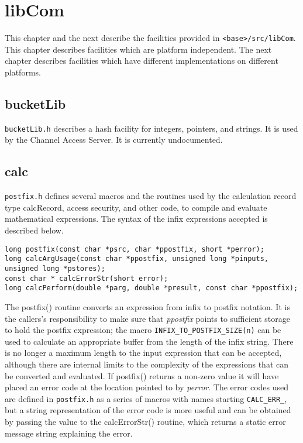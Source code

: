 \chapter{libCom}

This chapter and the next describe the facilities provided in \verb|<base>/src/libCom|.
This chapter describes facilities which are platform independent.
The next chapter describes facilities which have different implementations on different platforms.

\section{bucketLib}

\verb|bucketLib.h| describes a hash facility for integers, pointers, and strings.
It is used by the Channel Access Server.
It is currently undocumented.

\section{calc}

\verb|postfix.h| defines several macros and the routines used by the calculation record type calcRecord, access security, and other code, to compile and evaluate mathematical expressions.
The syntax of the infix expressions accepted is described below.

\begin{verbatim}
long postfix(const char *psrc, char *ppostfix, short *perror);
long calcArgUsage(const char *ppostfix, unsigned long *pinputs, unsigned long *pstores);
const char * calcErrorStr(short error);
long calcPerform(double *parg, double *presult, const char *ppostfix);
\end{verbatim}

The postfix() routine converts an expression from infix to postfix notation.
It is the callers's responsibility to make sure that \emph{ppostfix} points to sufficient storage to hold the postfix expression;
the macro \verb|INFIX_TO_POSTFIX_SIZE(n)| can be used to calculate an appropriate buffer from the length of the infix string.
There is no longer a maximum length to the input expression that can be accepted, although there are internal limits to the complexity of the expressions that can be converted and evaluated.
If postfix() returns a non-zero value it will have placed an error code at the location pointed to by \emph{perror}.
The error codes used are defined in \verb|postfix.h| as a series of macros with names starting \verb|CALC_ERR_|, but a string representation of the error code is more useful and can be obtained by passing the value to the calcErrorStr() routine, which returns a static error message string explaining the error.

